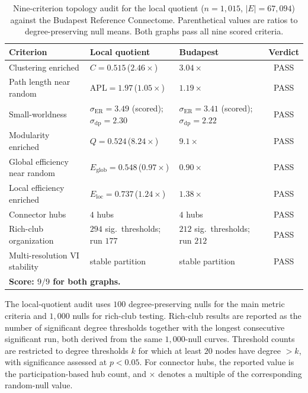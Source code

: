 \documentclass[12pt]{article}
\begin{document}
\begin{table}[htbp]
\centering
\small
\setlength{\tabcolsep}{4pt}
\renewcommand{\arraystretch}{1.05}
\caption{Nine-criterion topology audit for the local quotient
(\(n=1{,}015\), \(|E|=67{,}094\)) against the Budapest Reference Connectome.
Parenthetical values are ratios to degree-preserving null means.  Both
graphs pass all nine scored criteria.}
\label{tab:local-repair-nine-criteria}
\begin{tabularx}{\textwidth}{p{} X X c}
\toprule
Criterion & Local quotient & Budapest & Verdict \\
\midrule
Clustering enriched & \(C=0.515\)\,(\(2.46\times\)) & \(3.04\times\) & PASS \\
Path length near random & \(\mathrm{APL}=1.97\)\,(\(1.05\times\)) & \(1.19\times\) & PASS \\
Small-worldness & \(\sigma_{\mathrm{ER}}=3.49\) (scored); \(\sigma_{\mathrm{dp}}=2.30\) & \(\sigma_{\mathrm{ER}}=3.41\) (scored); \(\sigma_{\mathrm{dp}}=2.22\) & PASS \\
Modularity enriched & \(Q=0.524\)\,(\(8.24\times\)) & \(9.1\times\) & PASS \\
Global efficiency near random & \(E_{\mathrm{glob}}=0.548\)\,(\(0.97\times\)) & \(0.90\times\) & PASS \\
Local efficiency enriched & \(E_{\mathrm{loc}}=0.737\)\,(\(1.24\times\)) & \(1.38\times\) & PASS \\
Connector hubs & \(4\) hubs & \(4\) hubs & PASS \\
Rich-club organization & \(294\) sig.\ thresholds; run \(177\) & \(212\) sig.\ thresholds; run \(212\) & PASS \\
Multi-resolution VI stability & stable partition & stable partition & PASS \\
\midrule
\multicolumn{4}{l}{\textbf{Score: \(9/9\) for both graphs.}} \\
\bottomrule
\end{tabularx}
\end{table}

The local-quotient audit uses \(100\) degree-preserving nulls for the main
metric criteria and \(1{,}000\) nulls for rich-club testing.  Rich-club
results are reported as the number of significant degree thresholds together
with the longest consecutive significant run, both derived from the same
\(1{,}000\)-null curves.  Threshold counts are restricted to degree
thresholds \(k\) for which at least \(20\) nodes have degree \(>k\), with
significance assessed at \(p<0.05\).  For connector hubs, the reported value
is the participation-based hub count, and \(\times\) denotes a multiple of
the corresponding random-null value.
\end{document}
